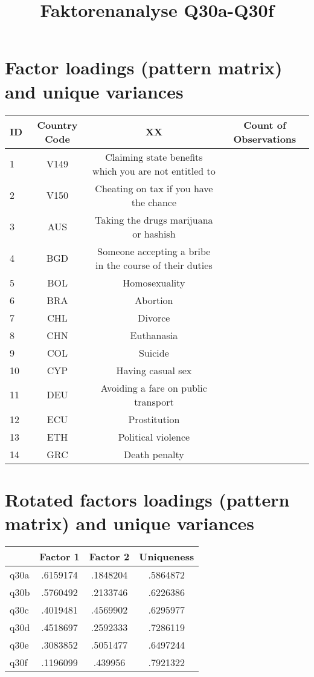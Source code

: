 \documentclass{article}
\title{Faktorenanalyse Q30a-Q30f}
\date{}
\begin{document}
\maketitle
\section{Factor loadings (pattern matrix) and unique variances}
\centering
{
\def\sym#1{\ifmmode^{#1}\else\(^{#1}\)\fi}
\begin{tabular}{l*{1}{ccc}}
  \hline\hline
 ID & Country Code & XX& Count of Observations \\ 
  \hline
1 & V149 & Claiming state benefits which you are not entitled to \\ 
  2 & V150 & Cheating on tax if you have the chance \\ 
  3 & AUS & Taking the drugs marijuana or hashish \\ 
  4 & BGD & Someone accepting a bribe in the course of their duties \\ 
  5 & BOL & Homosexuality \\ 
  6 & BRA & Abortion \\ 
  7 & CHL & Divorce \\ 
  8 & CHN & Euthanasia \\ 
  9 & COL & Suicide \\ 
  10 & CYP & Having casual sex \\ 
  11 & DEU & Avoiding a fare on public transport\\ 
  12 & ECU & Prostitution \\ 
  13 & ETH & Political violence \\ 
  14 & GRC & Death penalty \\ 
  \hline\hline
\end{tabular}
}
\bigskip
\bigskip
\bigskip

\section{Rotated factors loadings (pattern matrix) and unique variances}
\centering
{
\def\sym#1{\ifmmode^{#1}\else\(^{#1}\)\fi}
\begin{tabular}{l*{1}{ccc}}
\hline\hline
            &    Factor 1&    Factor 2&  Uniqueness\\
\hline
q30a        &    .6159174&    .1848204&    .5864872\\
q30b        &    .5760492&    .2133746&    .6226386\\
q30c        &    .4019481&    .4569902&    .6295977\\
q30d        &    .4518697&    .2592333&    .7286119\\
q30e        &    .3083852&    .5051477&    .6497244\\
q30f        &    .1196099&     .439956&    .7921322\\
\hline\hline
\end{tabular}
}
\end{document}

